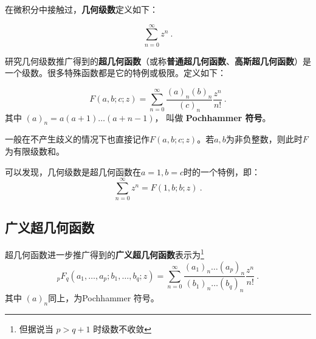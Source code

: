 

在微积分中接触过，\textbf{几何级数}定义如下：

\begin{equation}
\sum_{n=0}^\infty z^n~.
\end{equation}

研究几何级数推广得到的\textbf{超几何函数}（或称\textbf{普通超几何函数}、\textbf{高斯超几何函数}）是一个级数。很多特殊函数都是它的特例或极限。定义如下：

\begin{equation}
F(a,b;c;z) = \sum_{n=0}^\infty \frac{(a)_n(b)_n}{(c)_n} \frac{z^n}{n!}~.
\end{equation}
其中 $(a)_n = a(a+1)\dots(a+n-1)$， 叫做 \textbf{Pochhammer 符号}。

一般在不产生歧义的情况下也直接记作$F(a,b;c;z)$。若$a,b$为非负整数，则此时$F$为有限级数和。

可以发现，几何级数是超几何函数在$a=1,b=c$时的一个特例，即：
\begin{equation}
\sum_{n=0}^\infty z^n=F(1,b;b;z)~.
\end{equation}

\subsection{广义超几何函数}

超几何函数进一步推广得到的\textbf{广义超几何函数}表示为\footnote{但据说当 $p > q+1$ 时级数不收敛}
\begin{equation}
{_pF_q}(a_1,\dots, a_p; b_1, \dots, b_q; z) = \sum_{n=0}^\infty \frac{(a_1)_n\dots (a_p)_n}{(b_1)_n\dots(b_q)_n} \frac{z^n}{n!}~.
\end{equation}
其中 $(a)_n$同上，为Pochhammer 符号。

